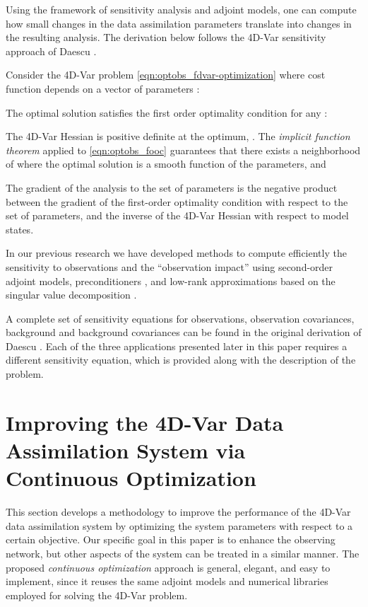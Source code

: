 \documentclass{article}
\begin{document}
Using the framework of sensitivity analysis and adjoint models, one can compute 
how small changes in the data assimilation parameters translate into changes in the resulting analysis.
The derivation below follows the 4D-Var sensitivity approach of Daescu \cite{Daescu_2008}.

Consider the 4D-Var problem \eqref{eqn:optobs_fdvar-optimization} where cost function 
depends on a vector of parameters :

The optimal solution  satisfies the first order optimality condition for any :

The 4D-Var Hessian is positive definite at the optimum, .
The \textit{implicit function theorem} \cite{krantz2002implicit} applied to \eqref{eqn:optobs_fooc} 
guarantees that there exists a neighborhood of  where the optimal solution  is 
a smooth function of the parameters, and 

The gradient of the analysis to the set of parameters is the negative product
between the gradient of the first-order optimality condition with respect to the set of parameters,
and the inverse of the 4D-Var Hessian with respect to model states. 



In our previous research we have developed methods to compute efficiently the sensitivity to observations
and the ``observation impact'' using second-order adjoint models, preconditioners \cite{Cioaca_2012}, and
low-rank approximations based on the singular value decomposition \cite{Cioaca_2013}. 

A complete set of sensitivity equations for observations, observation covariances, background and
background covariances can be found in the original derivation of Daescu \cite{Daescu_2008}.
Each of the three applications presented later in this paper requires a different sensitivity equation,
which is provided along with the description of the problem.




\section{Improving the 4D-Var Data Assimilation System via Continuous Optimization}\label{sec:optobs_contopt}


This section develops a methodology to improve the performance of the 4D-Var data assimilation system  
by optimizing the system parameters with respect to a certain objective.
Our specific goal in this paper is to enhance the observing network, but other aspects of the system can be 
treated in a similar manner.
The proposed \textit{continuous optimization} approach is general, elegant, and easy to implement,
since it reuses the same adjoint models and numerical libraries employed for solving the 4D-Var problem.
\end{document}
